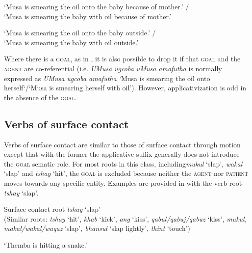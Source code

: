 \documentclass[output=paper]{langsci/langscibook}
\begin{document}
\glt ‘Musa is smearing the oil onto the baby because of mother.’ /\\
 ‘Musa is smearing the baby with oil because of mother.’


\glt ‘Musa is smearing the oil onto the baby outside.’ / \\
‘Musa is smearing the baby with oil outside.’ 
\z
\z

Where there is a \textsc{goal,} as in , it is also possible to drop it if that \textsc{goal} and the \textsc{agent} are co-referential (i.e. \textit{UMusa ugcoba uMusa amafutha} is normally expressed as \textit{UMusa ugcoba amafutha ‘}Musa is smearing the oil onto herself‘/‘Musa is smearing herself with oil’). However, applicativization is odd in the absence of the \textsc{goal.}

\subsection{Verbs of surface contact}\label{sec:sibanda:4.3}

Verbs of surface contact are similar to those of surface contact through motion except that with the former the applicative suffix generally does not introduce the \textsc{goal} sematic role. For most roots in this class, including\textit {mukul} ‘slap’, \textit{wakal} ‘slap’ and \textit{tshay} ‘hit’, the \textsc{goal} is excluded because neither the \textsc{agent} nor \textsc{patient} moves towards any specific entity. Examples are provided in  with the verb root \textit{tshay} ‘slap’.

\ea\label{ex:sibanda:11}
\settowidth{}
{Surface-contact root \textit {tshay} ‘slap’} \\
 (Similar roots: \textit{tshay} ‘hit’, \textit{khab} ‘kick’, \textit{ang} ‘kiss’, \textit{qabul/qabuj/qabuz} ‘kiss’, \textit{mukul, makal/wakal/waqaz} ‘slap’\textit{, bhansul} ‘slap lightly’, \textit{thint} ‘touch’)\\

\glt ‘Themba is hitting a snake.’
\end{document}
